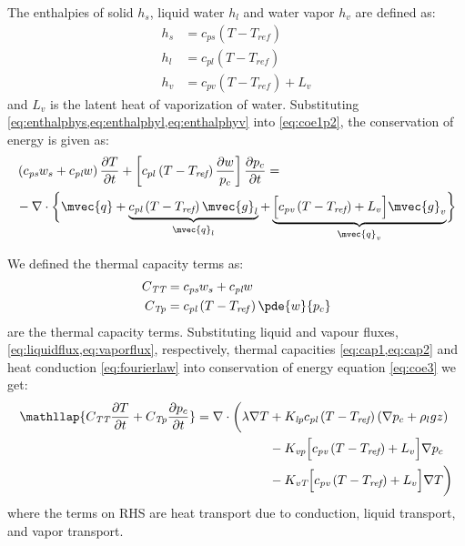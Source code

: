 The enthalpies of solid $h_s$, liquid water $h_l$ and water vapor $h_v$ are defined as:
\begin{align}
h_s &= c_{ps} \left(T - T_{\textit{ref}}\right) \label{eq:enthalphys}\\
h_l &= c_{pl} \left(T - T_{\textit{ref}}\right) \label{eq:enthalphyl}\\
h_v &= c_{pv} \left(T - T_{\textit{ref}}\right) + L_v \label{eq:enthalphyv}
\end{align}
and $L_v$ is the latent heat of vaporization of water. Substituting \cref{eq:enthalphys,eq:enthalphyl,eq:enthalphyv} into \cref{eq:coe1p2}, the conservation of energy is given as:
\begin{equation}
\begin{split}
&\left(c_{\textit{ps}} w_s + c_{\textit{pl}} w\right)\frac{\partial T}{\partial t} + \left[c_{pl} \left(T - T_{\textit{ref}}\right) \frac{\partial w}{p_c}\right]\frac{\partial p_c}{\partial t} =\\
& - \nabla \cdot \bigg\{ {\mvec{q} + \underbrace{ c_{\textit{pl}} \left(T - T_{\textit{ref}}\right)\mvec{g}_l}_{\mvec{q}_l} + \underbrace{ \Big[c_{\textit{pv}} \left(T - T_{\textit{ref}}\right) + L_v\Big]\mvec{g}_v}_{\mvec{q}_v} } \bigg\}
\end{split}
\label{eq:coe3}
\end{equation}

We defined the thermal capacity terms as:
\begin{align}
C_{\textit{TT}} &=  c_{\textit{ps}}w_s + c_{\textit{pl}}w \label{eq:cap1} \\
C_{\textit{Tp}} &=  c_{\textit{pl}} \left( T - T_{\mathit{ref}}\right) \pde{w}{p_c} \label{eq:cap2} 
\end{align}
are the thermal capacity terms. Substituting liquid and vapour fluxes, \cref{eq:liquidflux,eq:vaporflux}, respectively, thermal capacities \cref{eq:cap1,eq:cap2} and heat conduction \cref{eq:fourierlaw} into conservation of energy equation \cref{eq:coe3} we get:
\begin{align}
\begin{aligned}
		\mathllap{C_{\textit{TT}}\frac{\partial T}{\partial t} + C_{\textit{Tp}}\frac{\partial p_c}{\partial t}} = \nabla \cdot \bigg(\lambda \nabla T &+  K_{\textit{lp}} c_{\textit{pl}} \left(T - T_{\textit{ref}}\right) \left(\nabla p_c + \rho_l g z\right) \\
					&- K_{\textit{vp}} \Big[c_{\textit{pv}} \left(T - T_{\textit{ref}}\right) + L_v\Big] \nabla p_c \\ 
					&- K_{\textit{vT}} \Big[c_{\textit{pv}} \left(T - T_{\textit{ref}}\right) + L_v\Big] \nabla T \bigg)
\end{aligned}
\end{align}
where the terms on RHS are heat transport due to conduction, liquid transport, and vapor transport.


